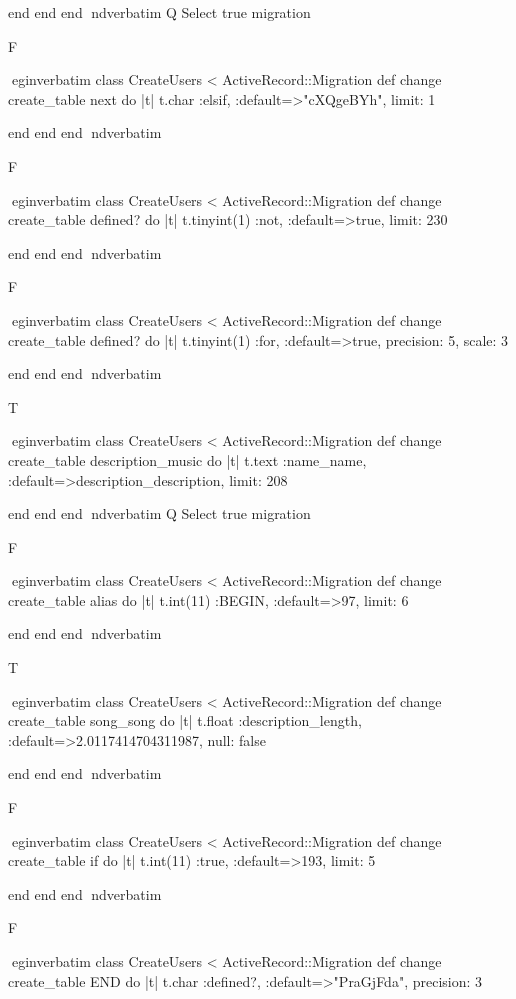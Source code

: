     end 
  end 
end
nd{verbatim}
Q
 Select true migration

F

egin{verbatim}
 class CreateUsers < ActiveRecord::Migration 
  def change 
    create_table next do |t| 
      t.char :elsif, :default=>"cXQgeBYh", limit: 1
    
    end 
  end 
end
nd{verbatim}

F

egin{verbatim}
 class CreateUsers < ActiveRecord::Migration 
  def change 
    create_table defined? do |t| 
      t.tinyint(1) :not, :default=>true, limit: 230
    
    end 
  end 
end
nd{verbatim}

F

egin{verbatim}
 class CreateUsers < ActiveRecord::Migration 
  def change 
    create_table defined? do |t| 
      t.tinyint(1) :for, :default=>true, precision: 5, scale: 3
    
    end 
  end 
end
nd{verbatim}

T

egin{verbatim}
 class CreateUsers < ActiveRecord::Migration 
  def change 
    create_table description_music do |t| 
      t.text :name_name, :default=>description_description, limit: 208
    
    end 
  end 
end
nd{verbatim}
Q
 Select true migration

F

egin{verbatim}
 class CreateUsers < ActiveRecord::Migration 
  def change 
    create_table alias do |t| 
      t.int(11) :BEGIN, :default=>97, limit: 6
    
    end 
  end 
end
nd{verbatim}

T

egin{verbatim}
 class CreateUsers < ActiveRecord::Migration 
  def change 
    create_table song_song do |t| 
      t.float :description_length, :default=>2.0117414704311987, null: false
    
    end 
  end 
end
nd{verbatim}

F

egin{verbatim}
 class CreateUsers < ActiveRecord::Migration 
  def change 
    create_table if do |t| 
      t.int(11) :true, :default=>193, limit: 5
    
    end 
  end 
end
nd{verbatim}

F

egin{verbatim}
 class CreateUsers < ActiveRecord::Migration 
  def change 
    create_table END do |t| 
      t.char :defined?, :default=>"PraGjFda", precision: 3
    
